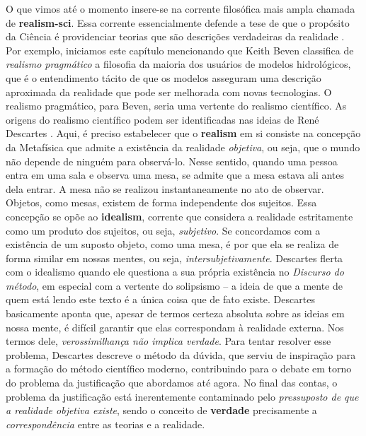 \documentclass[./main.tex]{subfiles}
\begin{document}
\par O que vimos até o momento insere-se na corrente filosófica mais ampla chamada de \textbf{\gls{realism-sci}}. Essa corrente essencialmente defende a tese de que o propósito da Ciência é providenciar teorias que são descrições verdadeiras da realidade \cite{bas1980}. Por exemplo, iniciamos este capítulo mencionando que Keith Beven classifica de \textit{realismo pragmático} a filosofia da maioria dos usuários de modelos hidrológicos, que é o entendimento tácito de que os modelos asseguram uma descrição aproximada da realidade que pode ser melhorada com novas tecnologias. O realismo pragmático, para Beven, seria uma vertente do realismo científico. As origens do realismo científico podem ser identificadas nas ideias de René Descartes \cite{Agazzi2017}. Aqui, é preciso estabelecer que o \textbf{\gls{realism}} em si consiste na concepção da Metafísica que admite a existência da realidade \textit{objetiva}, ou seja, que o mundo não depende de ninguém para observá-lo. Nesse sentido, quando uma pessoa entra em uma sala e observa uma mesa, se admite que a mesa estava ali antes dela entrar. A mesa não se realizou instantaneamente no ato de observar. Objetos, como mesas, existem de forma independente dos sujeitos. Essa concepção se opõe ao \textbf{\gls{idealism}}, corrente que considera a realidade estritamente como um produto dos sujeitos, ou seja, \textit{subjetivo}. Se concordamos com a existência de um suposto objeto, como uma mesa, é por que ela se realiza de forma similar em nossas mentes, ou seja, \textit{intersubjetivamente}. Descartes flerta com o idealismo quando ele questiona a sua própria existência no \textit{Discurso do método}, em especial com a vertente do solipsismo -- a ideia de que a mente de quem está lendo este texto é a única coisa que de fato existe. Descartes basicamente aponta que, apesar de termos certeza absoluta sobre as ideias em nossa mente, é difícil garantir que elas correspondam à realidade externa. Nos termos dele, \textit{verossimilhança não implica verdade}. Para tentar resolver esse problema, Descartes descreve o método da dúvida, que serviu de inspiração para a formação do método científico moderno, contribuindo para o debate em torno do problema da justificação que abordamos até agora. No final das contas, o problema da justificação está inerentemente contaminado pelo \textit{pressuposto de que a realidade objetiva existe}, sendo o conceito de \textbf{verdade} precisamente a \textit{correspondência} entre as teorias e a realidade.
\end{document}
